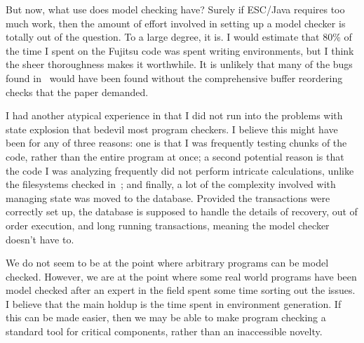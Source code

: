 \documentclass{article}
\begin{document}
\begin{multicols}{2}
But now, what use does model checking have?  Surely if ESC/Java
requires too much work, then the amount of effort involved in setting
up a model checker is totally out of the question.  To a large degree,
it is.  I would estimate that 80\% of the time I spent on the Fujitsu
code was spent writing environments, but I think the sheer
thoroughness makes it worthwhile.  It is unlikely that many of the
bugs found in~\cite{yang04using} would have been found without the
comprehensive buffer reordering checks that the paper demanded.

I had another atypical experience in that I did not run into the
problems with state explosion that bedevil most program checkers.  I
believe this might have been for any of three reasons: one is that I
was frequently testing chunks of the code, rather than the entire
program at once; a second potential reason is that the code I was
analyzing frequently did not perform intricate calculations, unlike
the filesystems checked in~\cite{yang04using}; and finally, a lot of
the complexity involved with managing state was moved to the database.
Provided the transactions were correctly set up, the database is
supposed to handle the details of recovery, out of order execution,
and long running transactions, meaning the model checker doesn't have
to.

We do not seem to be at the point where arbitrary programs can be
model checked.  However, we are at the point where some real world
programs have been model checked after an expert in the field spent
some time sorting out the issues.  I believe that the main holdup is
the time spent in environment generation.  If this can be made easier,
then we may be able to make program checking a standard tool for
critical components, rather than an inaccessible novelty.

\end{multicols}



\end{document}

